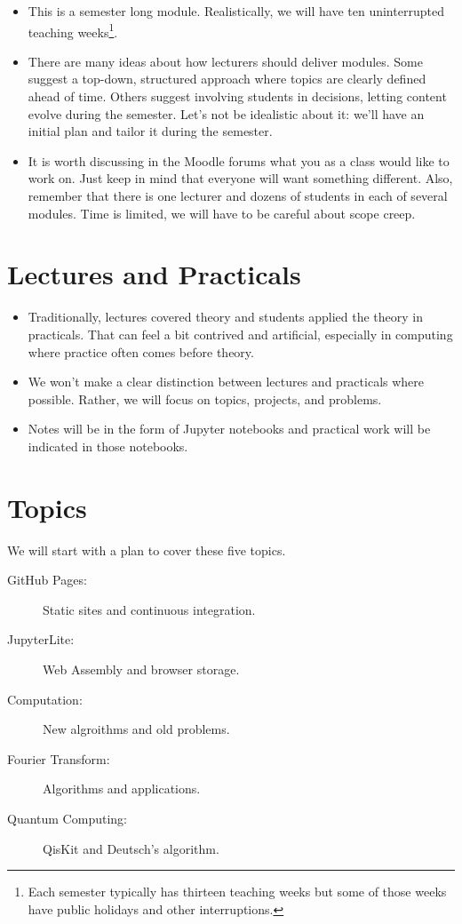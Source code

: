 \documentclass[a4paper]{tufte-handout}
\begin{document}
\begin{itemize}
  \item This is a semester long module. Realistically, we will have ten uninterrupted teaching weeks\footnote{Each semester typically has thirteen teaching weeks but some of those weeks have public holidays and other interruptions.}.
  \item There are many ideas about how lecturers should deliver modules. Some suggest a top-down, structured approach where topics are clearly defined ahead of time. Others suggest involving students in decisions, letting content evolve during the semester. Let's not be idealistic about it: we'll have an initial plan and tailor it during the semester.
  \item It is worth discussing in the Moodle forums what you as a class would like to work on. Just keep in mind that everyone will want something different. Also, remember that there is one lecturer and dozens of students in each of several modules. Time is limited, we will have to be careful about scope creep.
\end{itemize}

 
\section{Lectures and Practicals}

\begin{itemize}
  \item Traditionally, lectures covered theory and students applied the theory in practicals. That can feel a bit contrived and artificial, especially in computing where practice often comes before theory.
  \item We won't make a clear distinction between lectures and practicals where possible. Rather, we will focus on topics, projects, and problems.
  \item Notes will be in the form of Jupyter notebooks and practical work will be indicated in those notebooks.
\end{itemize}


\section{Topics}

We will start with a plan to cover these five topics.

\begin{description}
  \item[GitHub Pages:] Static sites and continuous integration.
  \item[JupyterLite:] Web Assembly and browser storage.
  \item[Computation:] New algroithms and old problems. 
  \item[Fourier Transform:] Algorithms and applications.
  \item[Quantum Computing:] QisKit and Deutsch's algorithm.
\end{description}
\end{document}
